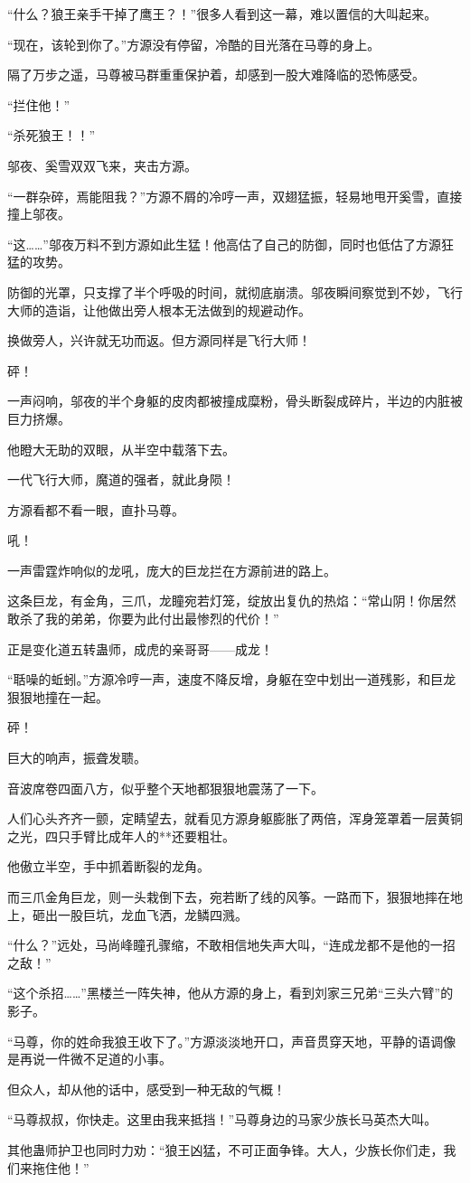 \begin{this_body}
“什么？狼王亲手干掉了鹰王？！”很多人看到这一幕，难以置信的大叫起来。

“现在，该轮到你了。”方源没有停留，冷酷的目光落在马尊的身上。

隔了万步之遥，马尊被马群重重保护着，却感到一股大难降临的恐怖感受。

“拦住他！”

“杀死狼王！！”

邬夜、奚雪双双飞来，夹击方源。

“一群杂碎，焉能阻我？”方源不屑的冷哼一声，双翅猛振，轻易地甩开奚雪，直接撞上邬夜。

“这……”邬夜万料不到方源如此生猛！他高估了自己的防御，同时也低估了方源狂猛的攻势。

防御的光罩，只支撑了半个呼吸的时间，就彻底崩溃。邬夜瞬间察觉到不妙，飞行大师的造诣，让他做出旁人根本无法做到的规避动作。

换做旁人，兴许就无功而返。但方源同样是飞行大师！

砰！

一声闷响，邬夜的半个身躯的皮肉都被撞成糜粉，骨头断裂成碎片，半边的内脏被巨力挤爆。

他瞪大无助的双眼，从半空中载落下去。

一代飞行大师，魔道的强者，就此身陨！

方源看都不看一眼，直扑马尊。

吼！

一声雷霆炸响似的龙吼，庞大的巨龙拦在方源前进的路上。

这条巨龙，有金角，三爪，龙瞳宛若灯笼，绽放出复仇的热焰：“常山阴！你居然敢杀了我的弟弟，你要为此付出最惨烈的代价！”

正是变化道五转蛊师，成虎的亲哥哥——成龙！

“聒噪的蚯蚓。”方源冷哼一声，速度不降反增，身躯在空中划出一道残影，和巨龙狠狠地撞在一起。

砰！

巨大的响声，振聋发聩。

音波席卷四面八方，似乎整个天地都狠狠地震荡了一下。

人们心头齐齐一颤，定睛望去，就看见方源身躯膨胀了两倍，浑身笼罩着一层黄铜之光，四只手臂比成年人的**还要粗壮。

他傲立半空，手中抓着断裂的龙角。

而三爪金角巨龙，则一头栽倒下去，宛若断了线的风筝。一路而下，狠狠地摔在地上，砸出一股巨坑，龙血飞洒，龙鳞四溅。

“什么？”远处，马尚峰瞳孔骤缩，不敢相信地失声大叫，“连成龙都不是他的一招之敌！”

“这个杀招……”黑楼兰一阵失神，他从方源的身上，看到刘家三兄弟“三头六臂”的影子。

“马尊，你的姓命我狼王收下了。”方源淡淡地开口，声音贯穿天地，平静的语调像是再说一件微不足道的小事。

但众人，却从他的话中，感受到一种无敌的气概！

“马尊叔叔，你快走。这里由我来抵挡！”马尊身边的马家少族长马英杰大叫。

其他蛊师护卫也同时力劝：“狼王凶猛，不可正面争锋。大人，少族长你们走，我们来拖住他！”

\end{this_body}

